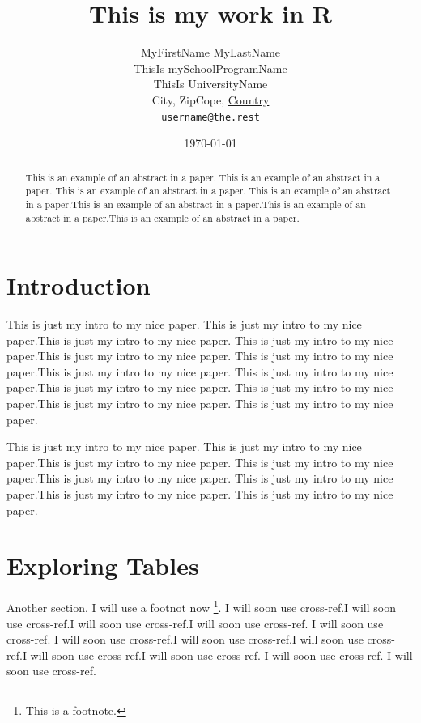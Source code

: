 \documentclass[11pt]{article}
\title{This is my work in R}
\author{
        MyFirstName MyLastName\\
        ThisIs mySchoolProgramName\\
        ThisIs UniversityName\\
        City, ZipCope, \underline{Country}\\
        \texttt{username@the.rest}
}
\date{\today}  %
\begin{document}

\maketitle 

\begin{abstract}
This is an example of an abstract in a paper. This is an example of an abstract in a paper. This is an example of an abstract in a paper. This is an example of an abstract in a paper.This is an example of an abstract in a paper.This is an example of an abstract in a paper.This is an example of an abstract in a paper.

\end{abstract}



\section*{Introduction} %

This is just my intro to my nice paper. This is just my intro to my nice paper.This is just my intro to my nice paper. This is just my intro to my nice paper.This is just my intro to my nice paper. This is just my intro to my nice paper.This is just my intro to my nice paper. This is just my intro to my nice paper.This is just my intro to my nice paper. This is just my intro to my nice paper.This is just my intro to my nice paper. This is just my intro to my nice paper.

This is just my intro to my nice paper. This is just my intro to my nice paper.This is just my intro to my nice paper. This is just my intro to my nice paper.This is just my intro to my nice paper. This is just my intro to my nice paper.This is just my intro to my nice paper. This is just my intro to my nice paper.


\section{Exploring Tables}\label{explo-tables} %

Another section. I will use a footnot now \footnote{This is a footnote.}. I will soon use cross-ref.I will soon use cross-ref.I will soon use cross-ref.I will soon use cross-ref. I will soon use cross-ref. I will soon use cross-ref.I will soon use cross-ref.I will soon use cross-ref.I will soon use cross-ref.I will soon use cross-ref. I will soon use cross-ref. I will soon use cross-ref.
\end{document}
